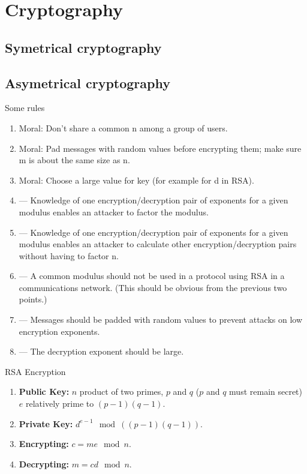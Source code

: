\chapter{Cryptography}
\localtableofcontents

\section{Symetrical cryptography}


\section{Asymetrical cryptography}

Some rules
\begin{enumerate}
    \item Moral: Don’t share a common n among a group of users. 
    \item Moral: Pad messages with random values before encrypting them;
        make sure m is about the same size as n.
    \item Moral: Choose a large value for key (for example for d in RSA).
    \item — Knowledge of one encryption/decryption pair of exponents for
        a given modulus enables an attacker to factor the modulus.
    \item — Knowledge of one encryption/decryption pair of exponents for
        a given modulus enables an attacker to calculate other
        encryption/decryption pairs without having to factor n.
    \item — A common modulus should not be used in a protocol using RSA in
        a communications network. (This should be obvious from the previous
        two points.)
    \item — Messages should be padded with random values to prevent attacks
        on low encryption exponents.
    \item — The decryption exponent should be large. 
\end{enumerate}


RSA Encryption
\begin{enumerate}
    \item[]\textbf{Public Key:}
    $n$ product of two primes, $p$ and $q$ ($p$ and $q$ must remain secret)
    $e$ relatively prime to $(p - 1)(q - 1)$.
    \item[]\textbf{Private Key:}
    $d^{e-1} \mod ((p - 1)(q - 1)).$
    \item[]\textbf{Encrypting:}
    $c = me \mod n.$
    \item[]\textbf{Decrypting:}
    $m = cd \mod n.$
\end{enumerate}










